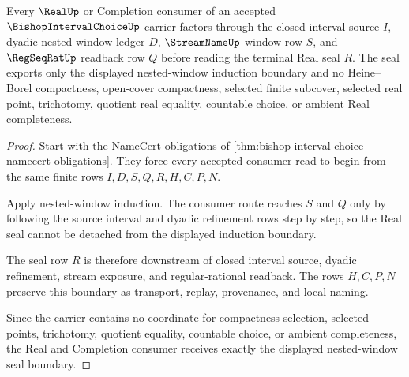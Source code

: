 \begin{theorem}
\label{thm:bishop-interval-choice-real-seal-boundary}
Every $\RealUp$ or Completion consumer of an accepted $\BishopIntervalChoiceUp$ carrier factors through the closed interval source $I$, dyadic nested-window ledger $D$, $\StreamNameUp$ window row $S$, and $\RegSeqRatUp$ readback row $Q$ before reading the terminal Real seal $R$. The seal exports only the displayed nested-window induction boundary and no Heine--Borel compactness, open-cover compactness, selected finite subcover, selected real point, trichotomy, quotient real equality, countable choice, or ambient Real completeness.
\end{theorem}
\begin{proof}
Start with the NameCert obligations of \autoref{thm:bishop-interval-choice-namecert-obligations}. They force every accepted consumer read to begin from the same finite rows $I,D,S,Q,R,H,C,P,N$.

Apply nested-window induction. The consumer route reaches $S$ and $Q$ only by following the source interval and dyadic refinement rows step by step, so the Real seal cannot be detached from the displayed induction boundary.

The seal row $R$ is therefore downstream of closed interval source, dyadic refinement, stream exposure, and regular-rational readback. The rows $H,C,P,N$ preserve this boundary as transport, replay, provenance, and local naming.

Since the carrier contains no coordinate for compactness selection, selected points, trichotomy, quotient equality, countable choice, or ambient completeness, the Real and Completion consumer receives exactly the displayed nested-window seal boundary.
\end{proof}


\begin{closurestatus}{\BishopIntervalChoiceUp}
  \theoryclosure{\seedClosure}
  \formalstatus{\unformalizedV}
\end{closurestatus}

